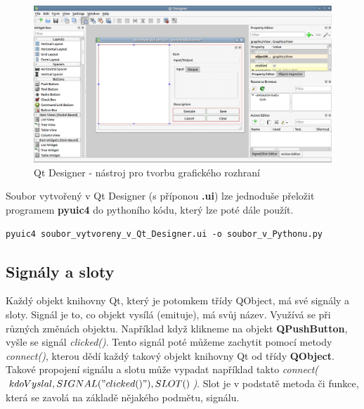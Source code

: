 \begin{figure}[h]
	\centering
	\includegraphics[scale=0.35]{pictures/qt/qt_designer}
	\caption{Qt Designer - nástroj pro tvorbu grafického rozhraní}
  	\label{qtdesigner}
\end{figure}

Soubor vytvořený v Qt Designer (s příponou \textbf{.ui}) lze jednoduše přeložit programem \textbf{pyuic4} do pythoního kódu, který lze poté dále použít. \\

\begin{lstlisting}[label=pyuic4,caption={pyuic4 - přeložení .ui souboru do pythoního kódu}]
		pyuic4 soubor_vytvoreny_v_Qt_Designer.ui -o soubor_v_Pythonu.py 
\end{lstlisting}

\newpage
\subsection{Signály a sloty}
Každý objekt knihovny Qt, který je potomkem třídy QObject, má své signály a sloty. Signál je to, co objekt vysílá (emituje), má svůj název. Využívá se při různých změnách objektu. Například když klikneme na objekt \textbf{QPushButton}, vyšle se signál \textit{clicked()}. Tento signál poté můžeme zachytit pomocí metody \textit{connect()}, kterou dědí každý takový objekt knihovny Qt od třídy \textbf{QObject}. Takové propojení signálu a slotu může vypadat například takto \textit{connect($kdoVyslal,SIGNAL("clicked()"), SLOT()$)}. Slot je v podstatě metoda či funkce, která se zavolá na základě nějakého podmětu, signálu. 

